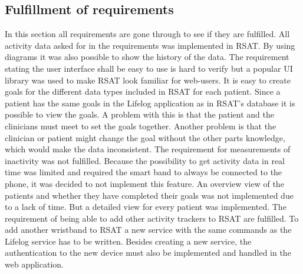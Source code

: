 \documentclass{cslthse-msc}
\begin{document}
\subsection{Fulfillment of requirements}

In this section all requirements are gone through to see if they are fulfilled. All activity data asked for in the requirements was implemented in RSAT. By using diagrams it was also possible to show the history of the data. The requirement stating the user interface shall be easy to use is hard to verify but a popular UI library was used to make RSAT look familiar for web-users. It is easy to create goals for the different data types included in RSAT for each patient. Since a patient has the same goals in the Lifelog application as in RSAT’s database it is possible to view the goals. A problem with this is that the patient and the clinicians must meet to set the goals together. Another problem is that the clinician or patient might change the goal without the other parts knowledge, which would make the data inconsistent. The requirement for measurements of inactivity was not fulfilled. Because the possibility to get activity data in real time was limited and required the smart band to always be connected to the phone, it was decided to not implement this feature. An overview view of the patients and whether they have completed their goals was not implemented due to a lack of time. But a detailed view for every patient was implemented. The requirement of being able to add other activity trackers to RSAT are fulfilled. To add another wristband to RSAT a new service with the same commands as the Lifelog service has to be written. Besides creating a new service, the authentication to the new device must also be implemented and handled in the web application.




\end{document}
